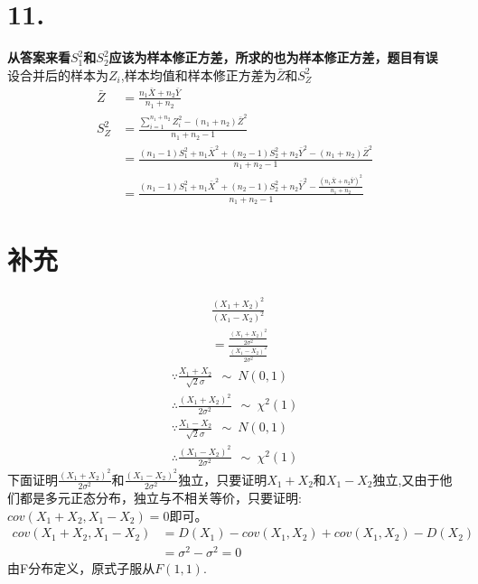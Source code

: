 \documentclass[a4paper,twocolumn]{ctexart}
\begin{document}
\section*{11.}
\textbf{从答案来看$S_1^2$和$S_2^2$应该为样本修正方差，所求的也为样本修正方差，题目有误}\\
设合并后的样本为$Z_i$,样本均值和样本修正方差为$\bar{Z}$和$S_Z^2$
\begin{align*}
\bar{Z}&=\frac{n_1\bar{X}+n_2\bar{Y}}{n_1+n_2}\\
S_Z^2&=\frac{\sum_{i=1}^{n_1+n_2}Z_i^2-(n_1+n_2)\bar{Z}^2}{n_1+n_2-1}\\
&=\frac{(n_1-1)S_1^2+n_1\bar{X}^2+(n_2-1)S_2^2+n_2\bar{Y}^2-(n_1+n_2)\bar{Z}^2}{n_1+n_2-1}\\
&=\frac{(n_1-1)S_1^2+n_1\bar{X}^2+(n_2-1)S_2^2+n_2\bar{Y}^2-\frac{\left(n_1\bar{X}+n_2\bar{Y}\right)^2}{n_1+n_2}}{n_1+n_2-1}
\end{align*}
\section*{补充}
\begin{align*}
&\frac{(X_1+X_2)^2}{(X_1-X_2)^2}\\
&=\frac{\frac{(X_1+X_2)^2}{2\sigma^2}}
{\frac{(X_1-X_2)^2}{2\sigma^2}}
\end{align*}
\begin{align*}
\because \frac{X_1+X_2}{\sqrt{2}\sigma}~~\sim~N(0,1)\\
\therefore \frac{(X_1+X_2)^2}{2\sigma^2}~~\sim~\chi^2(1)\\
\because \frac{X_1-X_2}{\sqrt{2}\sigma}~~\sim~N(0,1)\\
\therefore \frac{(X_1-X_2)^2}{2\sigma^2}~~\sim~\chi^2(1)
\end{align*}
下面证明$\frac{(X_1+X_2)^2}{2\sigma^2}$和$\frac{(X_1-X_2)^2}{2\sigma^2}$独立，只要证明$X_1+X_2$和$X_1-X_2$独立,又由于他们都是多元正态分布，独立与不相关等价，只要证明:$cov(X_1+X_2,X_1-X_2)=0$即可。
\begin{align*}
cov(X_1+X_2,X_1-X_2)&=D(X_1)-cov(X_1,X_2)+cov(X_1,X_2)-D(X_2)\\
&=\sigma^2-\sigma^2=0
\end{align*}
由F分布定义，原式子服从$F(1,1)$.
\end{document}
